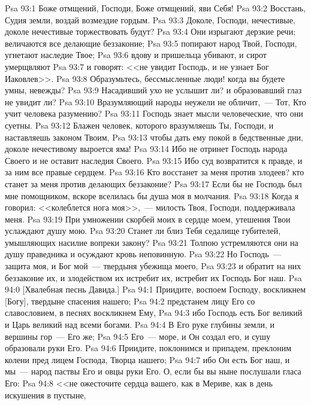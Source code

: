 \rsbpar\vs Psa 93:1 Боже отмщений, Господи, Боже отмщений, яви Себя!
\vs Psa 93:2 Восстань, Судия земли, воздай возмездие гордым.
\vs Psa 93:3 Доколе, Господи, нечестивые, доколе нечестивые торжествовать будут?
\vs Psa 93:4 Они изрыгают дерзкие речи; величаются все делающие беззаконие;
\vs Psa 93:5 попирают народ Твой, Господи, угнетают наследие Твое;
\vs Psa 93:6 вдову и пришельца убивают, и сирот умерщвляют
\vs Psa 93:7 и говорят: <<не увидит Господь, и не узнает Бог Иаковлев>>.
\vs Psa 93:8 Образумьтесь, бессмысленные люди! когда вы будете умны, невежды?
\vs Psa 93:9 Насадивший ухо не услышит ли? и образовавший глаз не увидит ли?
\vs Psa 93:10 Вразумляющий народы неужели не обличит,~--- Тот, Кто учит человека разумению?
\vs Psa 93:11 Господь знает мысли человеческие, что они суетны.
\vs Psa 93:12 Блажен человек, которого вразумляешь Ты, Господи, и наставляешь законом Твоим,
\vs Psa 93:13 чтобы дать ему покой в бедственные дни, доколе нечестивому выроется яма!
\vs Psa 93:14 Ибо не отринет Господь народа Своего и не оставит наследия Своего.
\vs Psa 93:15 Ибо суд возвратится к правде, и за ним  все правые сердцем.
\vs Psa 93:16 Кто восстанет за меня против злодеев? кто станет за меня против делающих беззаконие?
\vs Psa 93:17 Если бы не Господь был мне помощником, вскоре вселилась бы душа моя в  молчания.
\vs Psa 93:18 Когда я говорил: <<колеблется нога моя>>,~--- милость Твоя, Господи, поддерживала меня.
\vs Psa 93:19 При умножении скорбей моих в сердце моем, утешения Твои услаждают душу мою.
\vs Psa 93:20 Станет ли близ Тебя седалище губителей, умышляющих насилие вопреки закону?
\vs Psa 93:21 Толпою устремляются они на душу праведника и осуждают кровь неповинную.
\vs Psa 93:22 Но Господь~--- защита моя, и Бог мой~--- твердыня убежища моего,
\vs Psa 93:23 и обратит на них беззаконие их, и злодейством их истребит их, истребит их Господь Бог наш.
\vs Psa 94:0 [Хвалебная песнь Давида.]
\rsbpar\vs Psa 94:1 Приидите, воспоем Господу, воскликнем [Богу], твердыне спасения нашего;
\vs Psa 94:2 предстанем лицу Его со славословием, в песнях воскликнем Ему,
\vs Psa 94:3 ибо Господь есть Бог великий и Царь великий над всеми богами.
\vs Psa 94:4 В Его руке глубины земли, и вершины гор~--- Его же;
\vs Psa 94:5 Его~--- море, и Он создал его, и сушу образовали руки Его.
\vs Psa 94:6 Приидите, поклонимся и припадем, преклоним колени пред лицем Господа, Творца нашего;
\vs Psa 94:7 ибо Он есть Бог наш, и мы~--- народ паствы Его и овцы руки Его. О, если бы вы ныне послушали гласа Его:
\vs Psa 94:8 <<не ожесточите сердца вашего, как в Мериве, как в день искушения в пустыне,
